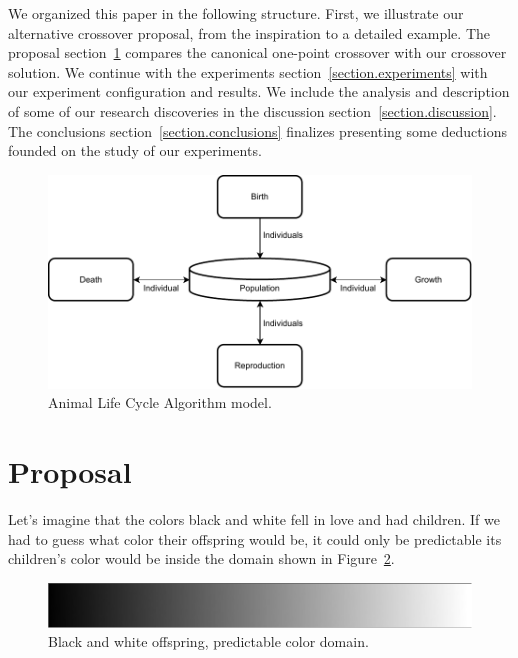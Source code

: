 \documentclass[graybox]{svmult}
\begin{document}
    We organized this paper in the following structure. First, we illustrate our alternative crossover proposal, from the inspiration to a detailed example. The proposal section~\ref{section.proposal} compares the canonical one-point crossover with our crossover solution. We continue with the experiments section~\ref{section.experiments} with our experiment configuration and results. We include the analysis and description of some of our research discoveries in the discussion section~\ref{section.discussion}. The conclusions section~\ref{section.conclusions} finalizes presenting some deductions founded on the study of our experiments.


    \begin{figure}[!ht]
        \centering
        \includegraphics[width=0.90\linewidth]{img/fig_algorithm_model.pdf}
        \caption{Animal Life Cycle Algorithm model\cite{Felix-Saul2023}.} \label{fig.algorithm_model}
        \end{figure}


\section{Proposal}
    \label{section.proposal}

    Let's imagine that the colors black and white fell in love and had children. If we had to guess what color their offspring would be, it could only be predictable its children's color would be inside the domain shown in Figure~\ref{fig.grayscale_continuous}.

    \begin{figure}[!ht]
        \centering
        \includegraphics[width=0.90\linewidth]{img/fig_grayscale_continuous.pdf}
        \caption{Black and white offspring, predictable color domain.} \label{fig.grayscale_continuous}
        \end{figure}
\end{document}
